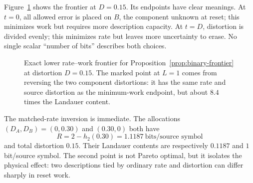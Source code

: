 \documentclass[letterpaper,onecolumn]{IEEEtran}
\theoremstyle{definition}
\theoremstyle{remark}
\newcommand{\1}{\mathbf{1}}
\newcommand{\hbin}{h_2}
\begin{document}
Figure~\ref{fig:binary-frontier} shows the frontier at $D=0.15$. Its endpoints
have clear meanings. At $t=0$, all allowed error is placed on $B$, the component
unknown at reset; this minimizes work but requires more description capacity.
At $t=D$, distortion is divided evenly; this minimizes rate but leaves more
uncertainty to erase. No single scalar ``number of bits'' describes both choices.

\begin{figure}[!t]
\centering
{}
\caption{Exact lower rate--work frontier for Proposition~\ref{prop:binary-frontier}
at distortion $D=0.15$. The marked point at $L=1$ comes from reversing the two
component distortions: it has the same rate and source distortion as the
minimum-work endpoint, but about $8.4$ times the Landauer content.}
\label{fig:binary-frontier}
\end{figure}

The matched-rate inversion is immediate. The allocations
$(D_A,D_B)=(0,0.30)$ and $(0.30,0)$ both have
\begin{equation}
 R=2-\hbin(0.30)=1.1187\ \text{bits/source symbol}
\end{equation}
and total distortion $0.15$. Their Landauer contents are respectively
$0.1187$ and $1$ bit/source symbol. The second point is not Pareto optimal, but
it isolates the physical effect: two descriptions tied by ordinary rate and
distortion can differ sharply in reset work.
\end{document}
